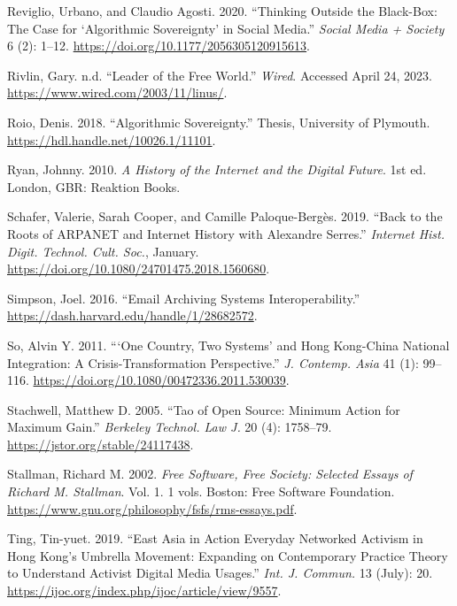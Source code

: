 \documentclass[
  a4paper,
]{book}
\newlength{\cslhangindent}
\newlength{\cslentryspacingunit} %
\newenvironment{CSLReferences}[2] %
 {%
  \setlength{\parindent}{0pt}
  \ifodd #1
  \let\oldpar\par
  \def\par{\hangindent=\cslhangindent\oldpar}
  \fi
  \setlength{\parskip}{#2\cslentryspacingunit}
 }%
 {}
\begin{document}
\begin{CSLReferences}{1}{0}
\hypertarget{ref-reviglioThinkingOutsideBlackBox2020}{}
Reviglio, Urbano, and Claudio Agosti. 2020. {``Thinking {Outside} the {Black-Box}: {The Case} for {`{Algorithmic Sovereignty}'} in {Social Media}.''} \emph{Social Media + Society} 6 (2): 1--12. \url{https://doi.org/10.1177/2056305120915613}.

\hypertarget{ref-rivlinLeaderFreeWorld}{}
Rivlin, Gary. n.d. {``Leader of the {Free World}.''} \emph{Wired}. Accessed April 24, 2023. \url{https://www.wired.com/2003/11/linus/}.

\hypertarget{ref-roioAlgorithmicSovereignty2018}{}
Roio, Denis. 2018. {``Algorithmic {Sovereignty}.''} Thesis, {University of Plymouth}. \url{https://hdl.handle.net/10026.1/11101}.

\hypertarget{ref-ryanHistoryInternetDigital2010}{}
Ryan, Johnny. 2010. \emph{A {History} of the {Internet} and the {Digital Future}}. 1st ed. {London, GBR}: {Reaktion Books}.

\hypertarget{ref-schaferBackRootsARPANET2019}{}
Schafer, Valerie, Sarah Cooper, and Camille Paloque-Bergès. 2019. {``Back to the Roots of {ARPANET} and {Internet} History with {Alexandre Serres}.''} \emph{Internet Hist. Digit. Technol. Cult. Soc.}, January. \url{https://doi.org/10.1080/24701475.2018.1560680}.

\hypertarget{ref-simpsonEmailArchivingSystems2016}{}
Simpson, Joel. 2016. {``Email {Archiving Systems Interoperability}.''} \url{https://dash.harvard.edu/handle/1/28682572}.

\hypertarget{ref-soOneCountryTwo2011}{}
So, Alvin Y. 2011. {``{`{One Country}, {Two Systems}'} and {Hong Kong-China National Integration}: {A Crisis-Transformation Perspective}.''} \emph{J. Contemp. Asia} 41 (1): 99--116. \url{https://doi.org/10.1080/00472336.2011.530039}.

\hypertarget{ref-stachwellTaoOpenSource2005}{}
Stachwell, Matthew D. 2005. {``Tao of {Open Source}: {Minimum Action} for {Maximum Gain}.''} \emph{Berkeley Technol. Law J.} 20 (4): 1758--79. \url{https://jstor.org/stable/24117438}.

\hypertarget{ref-stallmanFreeSoftwareFree2002}{}
Stallman, Richard M. 2002. \emph{Free {Software}, {Free Society}: {Selected Essays} of {Richard M}. {Stallman}}. Vol. 1. 1 vols. {Boston}: {Free Software Foundation}. \url{https://www.gnu.org/philosophy/fsfs/rms-essays.pdf}.

\hypertarget{ref-tingEastAsiaAction2019}{}
Ting, Tin-yuet. 2019. {``East {Asia} in {Action}\textbar{} {Everyday Networked Activism} in {Hong Kong}'s {Umbrella Movement}: {Expanding} on {Contemporary Practice Theory} to {Understand Activist Digital Media Usages}.''} \emph{Int. J. Commun.} 13 (July): 20. \url{https://ijoc.org/index.php/ijoc/article/view/9557}.


\end{CSLReferences}
\end{document}
